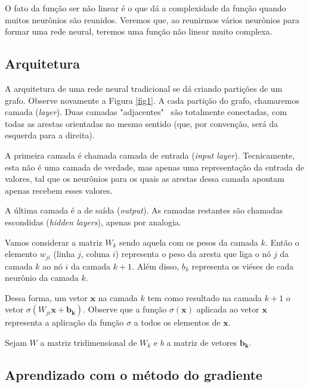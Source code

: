 \documentclass{article}
\begin{document}
            O fato da função ser não linear é o que dá a complexidade da função quando muitos neurônios são reunidos.
            Veremos que, ao reunirmos vários neurônios para formar uma rede neural, teremos uma função não linear muito complexa.

        \subsection{Arquitetura}

            A arquitetura de uma rede neural tradicional se dá criando partições de um grafo.
            Observe novamente a Figura \ref{fig1}.
            A cada partição do grafo, chamaremos camada (\textit{layer}).
            Duas camadas "adjacentes" \ são totalmente conectadas, com todas as arestas orientadas no mesmo sentido (que, por convenção, será da esquerda para a direita).

            A primeira camada é chamada camada de entrada (\textit{input layer}).
            Tecnicamente, esta não é uma camada de verdade, mas apenas uma representação da entrada de valores, tal que os neurônios para os quais as arestas dessa camada apontam apenas recebem esses valores.
            
            A última camada é a de saída (\textit{output}).
            As camadas restantes são chamadas escondidas (\textit{hidden layers}), apenas por analogia.

            Vamos considerar a matriz $W_k$ sendo aquela com os pesos da camada $k$.
            Então o elemento $w_{ji}$ (linha $j$, coluna $i$) representa o peso da aresta que liga o nó $j$ da camada $k$ ao nó $i$ da camada $k + 1$.
            Além disso, $b_k$ representa os viéses de cada neurônio da camada $k$.
            
            Dessa forma, um vetor $\mathbf{x}$ na camada $k$ tem como resultado na camada $k + 1$ o vetor $\sigma (W_{ji} \mathbf{x} + \mathbf{b_k})$.
            Observe que a função $\sigma(\mathbf{x})$ aplicada ao vetor $\mathbf{x}$ representa a aplicação da função $\sigma$ a todos os elementos de $\mathbf{x}$.

            Sejam $W$ a matriz tridimensional de $W_k$ e $b$ a matriz de vetores $\mathbf{b_k}$.

        \subsection{Aprendizado com o método do gradiente}
        
\end{document}
